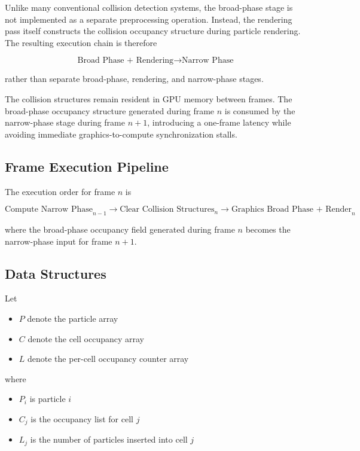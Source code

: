 \documentclass{article}
\begin{document}
Unlike many conventional collision detection systems, the broad-phase stage is not implemented as a separate preprocessing operation. Instead, the rendering pass itself constructs the collision occupancy structure during particle rendering. The resulting execution chain is therefore

\[
\text{Broad Phase + Rendering}
\rightarrow
\text{Narrow Phase}
\]

rather than separate broad-phase, rendering, and narrow-phase stages.

The collision structures remain resident in GPU memory between frames. The broad-phase occupancy structure generated during frame \(n\) is consumed by the narrow-phase stage during frame \(n+1\), introducing a one-frame latency while avoiding immediate graphics-to-compute synchronization stalls.

\subsection{Frame Execution Pipeline}

The execution order for frame \(n\) is

\[
\text{Compute Narrow Phase}_{n-1}
\rightarrow
\text{Clear Collision Structures}_{n}
\rightarrow
\text{Graphics Broad Phase + Render}_{n}
\]

where the broad-phase occupancy field generated during frame \(n\) becomes the narrow-phase input for frame \(n+1\).

\subsection{Data Structures}

Let

\begin{itemize}
    \item \(P\) denote the particle array
    \item \(C\) denote the cell occupancy array
    \item \(L\) denote the per-cell occupancy counter array
\end{itemize}

where

\begin{itemize}
    \item \(P_i\) is particle \(i\)
    \item \(C_j\) is the occupancy list for cell \(j\)
    \item \(L_j\) is the number of particles inserted into cell \(j\)
\end{itemize}
\end{document}
